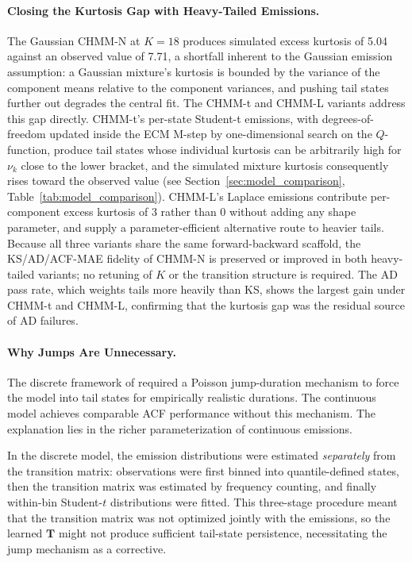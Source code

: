 \paragraph{Closing the Kurtosis Gap with Heavy-Tailed Emissions.}
The Gaussian CHMM-N at $K = 18$ produces simulated excess kurtosis of 5.04 against an observed value of 7.71, a shortfall inherent to the Gaussian emission assumption: a Gaussian mixture's kurtosis is bounded by the variance of the component means relative to the component variances, and pushing tail states further out degrades the central fit.
The CHMM-t and CHMM-L variants address this gap directly.
CHMM-t's per-state Student-t emissions, with degrees-of-freedom updated inside the ECM M-step by one-dimensional search on the $Q$-function, produce tail states whose individual kurtosis can be arbitrarily high for $\nu_k$ close to the lower bracket, and the simulated mixture kurtosis consequently rises toward the observed value (see Section~\ref{sec:model_comparison}, Table~\ref{tab:model_comparison}).
CHMM-L's Laplace emissions contribute per-component excess kurtosis of $3$ rather than $0$ without adding any shape parameter, and supply a parameter-efficient alternative route to heavier tails.
Because all three variants share the same forward-backward scaffold, the KS/AD/ACF-MAE fidelity of CHMM-N is preserved or improved in both heavy-tailed variants; no retuning of $K$ or the transition structure is required.
The AD pass rate, which weights tails more heavily than KS, shows the largest gain under CHMM-t and CHMM-L, confirming that the kurtosis gap was the residual source of AD failures.

\paragraph{Why Jumps Are Unnecessary.}
The discrete framework of \citet{alswaidan2026hybrid} required a Poisson jump-duration mechanism to force the model into tail states for empirically realistic durations.
The continuous model achieves comparable ACF performance without this mechanism.
The explanation lies in the richer parameterization of continuous emissions.

In the discrete model, the emission distributions were estimated \emph{separately} from the transition matrix: observations were first binned into quantile-defined states, then the transition matrix was estimated by frequency counting, and finally within-bin Student-$t$ distributions were fitted.
This three-stage procedure meant that the transition matrix was not optimized jointly with the emissions, so the learned $\mathbf{T}$ might not produce sufficient tail-state persistence, necessitating the jump mechanism as a corrective.

